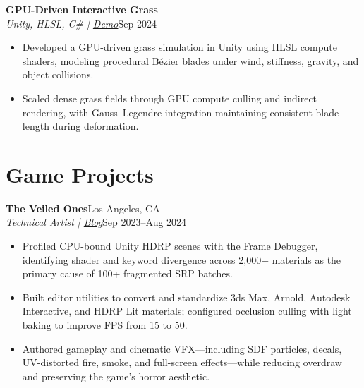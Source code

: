 \documentclass[10pt,letterpaper]{article}
\newcommand{\resumeEntry}[4]{
  \textbf{#1}\hfill #2\\
  \textit{#3}\hfill #4\\[-10pt]
}
\begin{document}
\resumeEntry{GPU-Driven Interactive Grass}{}{Unity, HLSL, C\# \;|\; \href{https://www.phuongp.com/highlights/2024/08/22/interactive-grass/}{Demo}}{Sep 2024}
\begin{itemize}
    \item Developed a GPU-driven grass simulation in Unity using HLSL compute shaders, modeling procedural B\'ezier blades under wind, stiffness, gravity, and object collisions.
    \item Scaled dense grass fields through GPU compute culling and indirect rendering, with Gauss--Legendre integration maintaining consistent blade length during deformation.
\end{itemize}


\section{Game Projects}

\resumeEntry{The Veiled Ones}{Los Angeles, CA}{Technical Artist \;|\; \href{https://www.phuongp.com/2024/03/11/the-veiled-ones/}{Blog}}{Sep 2023--Aug 2024}
\begin{itemize}
    \item Profiled CPU-bound Unity HDRP scenes with the Frame Debugger, identifying shader and keyword divergence across 2,000+ materials as the primary cause of 100+ fragmented SRP batches.
    \item Built editor utilities to convert and standardize 3ds Max, Arnold, Autodesk Interactive, and HDRP Lit materials; configured occlusion culling with light baking to improve FPS from 15 to 50.
    \item Authored gameplay and cinematic VFX---including SDF particles, decals, UV-distorted fire, smoke, and full-screen effects---while reducing overdraw and preserving the game's horror aesthetic.
\end{itemize}
\end{document}
